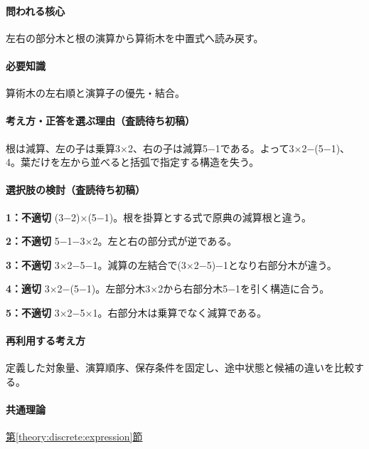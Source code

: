 \paragraph{問われる核心} 左右の部分木と根の演算から算術木を中置式へ読み戻す。

\paragraph{必要知識} 算術木の左右順と演算子の優先・結合。

\paragraph{考え方・正答を選ぶ理由（査読待ち初稿）} 根は減算、左の子は乗算3×2、右の子は減算5−1である。よって3×2−(5−1)、4。葉だけを左から並べると括弧で指定する構造を失う。

\paragraph{選択肢の検討（査読待ち初稿）}\mbox{}\par

\noindent\textbf{1：不適切} (3−2)×(5−1)。根を掛算とする式で原典の減算根と違う。\par

\noindent\textbf{2：不適切} 5−1−3×2。左と右の部分式が逆である。\par

\noindent\textbf{3：不適切} 3×2−5−1。減算の左結合で(3×2−5)−1となり右部分木が違う。\par

\noindent\textbf{4：適切} 3×2−(5−1)。左部分木3×2から右部分木5−1を引く構造に合う。\par

\noindent\textbf{5：不適切} 3×2−5×1。右部分木は乗算でなく減算である。\par

\paragraph{再利用する考え方} 定義した対象量、演算順序、保存条件を固定し、途中状態と候補の違いを比較する。

\paragraph{共通理論} \hyperref[theory:discrete:expression]{第\ref*{theory:discrete:expression}節}

